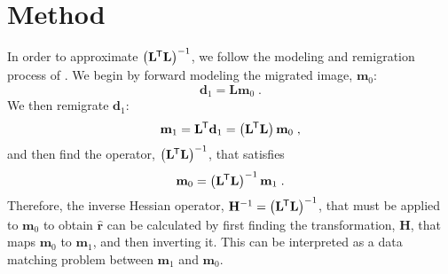 \section{Method}
    In order to approximate $\left ( \mathbf{L}^{\mkern-1.5mu\mathsf{T}}\mathbf{L}\right) ^{-1}$, we follow the modeling and remigration process of \cite{imop}. 
    We begin by forward modeling the migrated image, $\mathbf{m}_0$:
    \begin{equation}
        \mathbf{d}_1 = \mathbf{L}\mathbf{m}_0 \;.
    \end{equation}
    We then remigrate $\mathbf{d}_1$:
    \begin{equation}
        \mathbf{m}_1 = \mathbf{L}^{\mkern-1.5mu\mathsf{T}}\mathbf{d}_1 = \left ( \mathbf{L}^{\mkern-1.5mu\mathsf{T}}\mathbf{L}\right ) \mathbf{m}_0 \; ,
    \end{equation}
    and then find the operator, $\left ( \mathbf{L} ^{\mkern-1.5mu\mathsf{T}} \mathbf{L} \right )^{-1}$, that satisfies
    \begin{equation}
        \mathbf{m}_0 = \left ( \mathbf{L}^{\mkern-1.5mu\mathsf{T}}\mathbf{L} \right ) ^{-1} \mathbf{m}_1 \;.
    \end{equation}
    Therefore, the inverse Hessian operator, $\mathbf{H}^{-1} = \left ( \mathbf{L} ^{\mkern-1.5mu\mathsf{T}} \mathbf{L} \right )^{-1}$, that must be applied to $\mathbf{m}_0$ to obtain $\hat{\mathbf{r}}$ can be calculated by first finding the transformation, $\mathbf{H}$, that maps $\mathbf{m}_0$ to $\mathbf{m}_1$, and then inverting it.
    This can be interpreted as a data matching problem between $\mathbf{m}_1$ and $\mathbf{m}_0$.

\begin{center}
\end{center}


